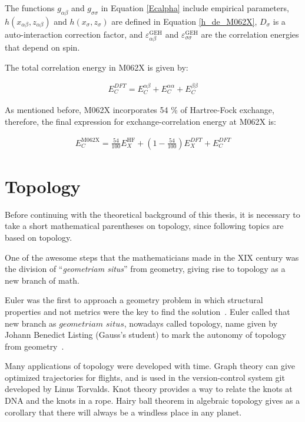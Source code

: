 \pagebreak

The functions $g_{\alpha\beta}$ and $g_{\sigma\sigma}$ in Equation
\ref{Ecalpha} include empirical parameters,
$h(x_{\alpha\beta},z_{\alpha\beta})$ and $h(x_{\sigma},z_{\sigma})$ are defined
in Equation \ref{h_de_M062X}, $D_\sigma$ is a auto-interaction correction
factor, and $\varepsilon^{\mathrm{GEH}}_{\alpha\beta}$ and
$\varepsilon^{\mathrm{GEH}}_{\sigma\sigma}$ are the correlation energies that
depend on spin.

The total correlation energy in M062X is given by:

\begin{align}
E^{DFT}_C = E^{\alpha\beta}_C + E_C^{\alpha\alpha} + E_C^{\beta\beta}
\end{align}

As mentioned before, M062X incorporates 54 \% of Hartree-Fock exchange,
therefore, the final expression for exchange-correlation energy at M062X is:

\begin{align}
E_C^{\mathrm{M062X}} = \frac{54}{100}E_X^{\mathrm{HF}} +
\left( 1- \frac{54}{100} \right)E_X^{DFT} + E_C^{DFT}
\end{align}

\section{Topology}

Before continuing with the theoretical background of this thesis, it is
necessary to take a short mathematical parentheses on topology, since following
topics are based on topology.

One of the awesome steps that the mathematicians made in the XIX century was
the division of ``\textit{geometriam situs}'' from geometry, giving rise to
topology as a new branch of math.

Euler was the first to approach a geometry problem in which structural
properties and not metrics were the key to find the solution~\cite{euler1736}.
Euler called that new branch as $geometriam$ $situs$, nowadays called topology,
name given by Johann Benedict Listing (Gauss's student) to mark the autonomy of
topology from geometry~\cite{listing}.

Many applications of topology were developed with time. Graph theory can give
optimized trajectories for flights, and is used in the version-control system
git developed by Linus Torvalds. Knot theory provides a way to relate the knots
at DNA and the knots in a rope. Hairy ball theorem in algebraic topology gives
as a corollary that there will always be a windless place in any planet.

